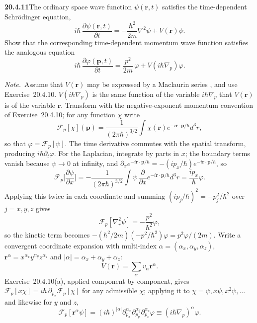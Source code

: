 \par\bigskip
\noindent\textbf{20.4.11}\quad The ordinary space wave function
$\psi(\mathbf{r},t)$ satisfies the time-dependent Schr\"odinger
equation,
\[
i\hbar\,\frac{\partial\psi(\mathbf{r},t)}{\partial t}
=-\frac{\hbar^{2}}{2m}\nabla^{2}\psi+V(\mathbf{r})\psi.
\]
Show that the corresponding time-dependent momentum wave function
satisfies the analogous equation
\[
i\hbar\,\frac{\partial\varphi(\mathbf{p},t)}{\partial t}
=\frac{p^{2}}{2m}\,\varphi+V(i\hbar\nabla_{p})\varphi.
\]
\par\emph{Note.}~Assume that $V(\mathbf{r})$ may be expressed by
a Maclaurin series , and use Exercise~20.4.10.
$V(i\hbar\nabla_{p})$ is the same function of the variable
$i\hbar\nabla_{p}$ that $V(\mathbf{r})$ is of the variable
$\mathbf{r}$.
\solution
Transform with the negative-exponent momentum
convention of Exercise~20.4.10; for any function $\chi$ write
\[
\mathcal F_p[\chi](\mathbf p)=\frac1{(2\pi\hbar)^{3/2}}\int\chi(\mathbf r)
e^{-i\mathbf r\cdot\mathbf p/\hbar}d^3r,
\]
so that $\varphi=\mathcal F_p[\psi]$. The time derivative commutes
with the spatial transform, producing $i\hbar\partial_t\varphi$.
For the Laplacian, integrate by parts in $x$; the boundary terms
vanish because $\psi\to0$ at infinity, and
$\partial_xe^{-i\mathbf r\cdot\mathbf p/\hbar}
=-(ip_x/\hbar)e^{-i\mathbf r\cdot\mathbf p/\hbar}$, so
\[
\mathcal F_p\Big[\frac{\partial\psi}{\partial x}\Big]
=-\frac1{(2\pi\hbar)^{3/2}}\int\psi\,
\frac{\partial}{\partial x}e^{-i\mathbf r\cdot\mathbf p/\hbar}d^3r
=\frac{ip_x}\hbar\varphi.
\]
Applying this twice in each coordinate and summing
$(ip_j/\hbar)^2=-p_j^2/\hbar^2$ over $j=x,y,z$ gives
\[
\mathcal F_p[\nabla_r^2\psi]
=-\frac{p^2}{\hbar^2}\varphi,
\]
so the kinetic term becomes
$-(\hbar^2/2m)(-p^2/\hbar^2)\varphi=p^2\varphi/(2m)$.
Write a convergent coordinate expansion with multi-index
$\alpha=(\alpha_x,\alpha_y,\alpha_z)$,
$\mathbf r^\alpha=x^{\alpha_x}y^{\alpha_y}z^{\alpha_z}$ and
$|\alpha|=\alpha_x+\alpha_y+\alpha_z$:
\[
V(\mathbf r)=\sum_\alpha v_\alpha\mathbf r^\alpha.
\]
Exercise~20.4.10(a), applied component by component, gives
$\mathcal F_p[x\chi]=i\hbar\,\partial_{p_x}\mathcal F_p[\chi]$
for any admissible $\chi$; applying it to
$\chi=\psi,x\psi,x^2\psi,\ldots$ and likewise for $y$ and $z$,
\[
\mathcal F_p[\mathbf r^\alpha\psi]
=(i\hbar)^{|\alpha|}\partial_{p_x}^{\alpha_x}
\partial_{p_y}^{\alpha_y}\partial_{p_z}^{\alpha_z}\varphi
\equiv(i\hbar\nabla_p)^\alpha\varphi.
\]
